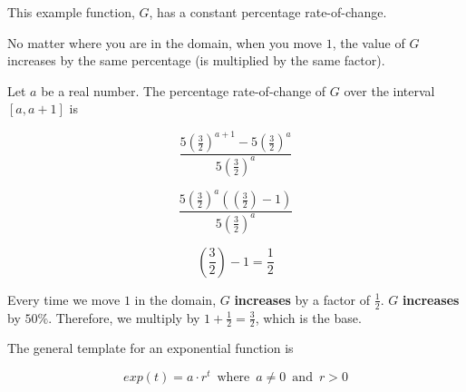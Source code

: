 \documentclass{ximera}
\begin{document}
This example function, $G$, has a constant percentage rate-of-change. 

No matter where you are in the domain, when you move $1$, the value of $G$ increases by the same percentage (is multiplied by the same factor).


Let $a$ be a real number.  The percentage rate-of-change of $G$ over the interval $[a,a+1]$ is 



\[    \frac{5 \left(\frac{3}{2}\right)^{a+1} - 5 \left(\frac{3}{2}\right)^a}{5 \left(\frac{3}{2}\right)^a}       \]


\[   \frac{5 \left(\frac{3}{2}\right)^a (\left(\frac{3}{2}\right) - 1) }{5 \left(\frac{3}{2}\right)^a}    \]


\[   \left(\frac{3}{2}\right) - 1 = \frac{1}{2}   \]

Every time we move $1$ in the domain, $G$ \textbf{\textcolor{blue!55!black}{increases}} by a factor of $\frac{1}{2}$.  $G$ \textbf{\textcolor{blue!55!black}{increases}} by $50\%$.  Therefore, we multiply by $1 + \frac{1}{2} = \frac{3}{2}$, which is the base.





The general template for an exponential function is 

\[   exp(t) = a \cdot r^t   \, \text{ where } \,  a \ne 0  \, \text{ and } \,    r > 0   \]
\end{document}
